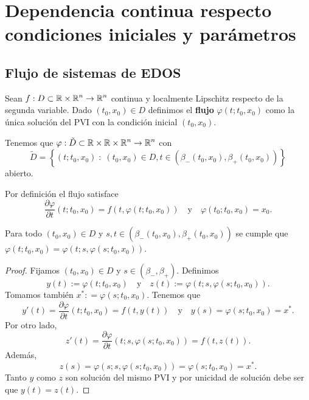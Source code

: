 \chapter{Dependencia continua respecto condiciones iniciales y parámetros}
\section{Flujo de sistemas de EDOS}
\begin{definition}[Flujo]
Sean $\displaystyle f : D \subset \mathbb{R} \times \mathbb{R}^{n} \to \mathbb{R}^{n} $ continua y localmente Lipschitz respecto de la segunda variable. Dado $\displaystyle \left(t_{0}, x_{0}\right)\in D $ definimos el \textbf{flujo} $\displaystyle \varphi\left(t; t_{0}, x_{0}\right) $ como la única solución del PVI con la condición inicial $\displaystyle \left(t_{0}, x_{0}\right) $. 
\end{definition}
\begin{observation}
	Tenemos que $\displaystyle \varphi : \tilde{D} \subset \mathbb{R} \times \mathbb{R} \times \mathbb{R}^{n} \to \mathbb{R}^{n} $ con 
	\[\tilde{D} = \left\{ \left(t; t_{0}, x_{0}\right) \; : \; \left(t_{0}, x_{0}\right)\in D, t \in \left(\beta_{-}\left(t_{0}, x_{0}\right), \beta_{+}\left(t_{0}, x_{0}\right)\right)\right\}  \]
	abierto.
\end{observation}
\begin{observation}
Por definición el flujo satisface
\[
\frac{\partial \varphi}{\partial t}\left(t; t_{0}, x_{0}\right)=f\left(t, \varphi\left(t; t_{0}, x_{0}\right)\right) \quad \text{y} \quad \varphi\left(t_{0}; t_{0}, x_{0}\right)=x_{0}
.\]
\end{observation}
\begin{lema}
Para todo $\displaystyle \left(t_{0}, x_{0}\right)\in D $ y $\displaystyle s,t\in \left(\beta_{-}\left(t_{0}, x_{0}\right), \beta_{+ }\left(t_{0}, x_{0}\right)\right) $ se cumple que $\displaystyle \varphi\left(t; t_{0}, x_{0}\right)=\varphi\left(t; s, \varphi\left(s; t_{0}, x_{0}\right)\right) $. 
\end{lema}
\begin{proof}
Fijamos $\displaystyle \left(t_{0}, x_{0}\right)\in D $ y $\displaystyle s \in \left(\beta_{- }, \beta_{+ }\right) $. Definimos
\[y\left(t\right):=\varphi\left(t; t_{0}, x_{0}\right)\quad \text{y} \quad z\left(t\right):=\varphi\left(t; s, \varphi\left(s; t_{0}, x_{0}\right)\right) .\]
Tomamos también $\displaystyle x^{*} : = \varphi\left(s; t_{0}, x_{0}\right) $. Tenemos que 
\[y'\left(t\right)=\frac{\partial \varphi}{\partial t}\left(t; t_{0}, x_{0}\right)=f\left(t, y\left(t\right)\right) \quad \text{y} \quad y\left(s\right)=\varphi\left(s; t_{0}, x_{0}\right)=x^{*} .\]
Por otro lado, 
\[z'\left(t\right)=\frac{\partial \varphi}{\partial t}\left(t; s, \varphi\left(s; t_{0}, x_{0}\right)\right)=f\left(t, z\left(t\right)\right) .\]
Además, 
\[z\left(s\right)=\varphi\left(s; s, \varphi\left(s; t_{0}, x_{0}\right)\right)=\varphi\left(s; t_{0}, x_{0}\right)=x^{*} .\]
Tanto $\displaystyle y $ como $\displaystyle z $ son solución del mismo PVI y por unicidad de solución debe ser que $\displaystyle y\left(t\right)=z\left(t\right) $. 
\end{proof}

